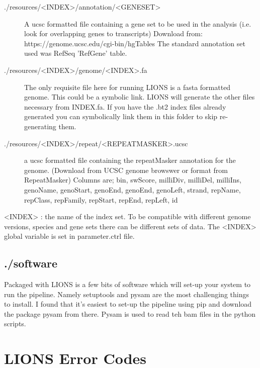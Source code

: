 \documentclass[11pt]{scrartcl}
\newcommand{\arrows}[1]{\textless #1\textgreater}
\begin{document}
\begin{description}
\item[./resources/\arrows{INDEX}/annotation/\arrows{GENESET}] A ucsc formatted file containing a gene set to be
  used in the analysis (i.e. look for overlapping genes to transcripts)
  Download from: https://genome.ucsc.edu/cgi-bin/hgTables
  The standard annotation set used was RefSeq 'RefGene' table.

\item[./resources/\arrows{INDEX}/genome/\arrows{INDEX}.fa] The only requisite file here for running LIONS is a fasta
  formatted genome. This could be a symbolic link. LIONS will generate
  the other files necessary from INDEX.fa. If you have the .bt2 index
  files already generated you can symbolically link them in this folder
  to skip re-generating them.

\item[./resources/\arrows{INDEX}/repeat/\arrows{REPEATMASKER}.ucsc] a ucsc formatted file containing the repeatMasker
  annotation for the genome.
  (Download from UCSC genome browswer or format from RepeatMasker)
  Columns are;
  bin, swScore, milliDiv, milliDel, milliIns, genoName, genoStart,
  genoEnd, genoEnd, genoLeft, strand, repName, repClass, repFamily,
  repStart, repEnd, repLeft, id
\end{description}
\begin{framed}
\arrows{INDEX} : the name of the index set. To be compatible with different
  genome versions, species and gene sets there can be different sets
  of data. The \arrows{INDEX} global variable is set in parameter.ctrl file.
\end{framed}

  \subsection{./software}
  Packaged with LIONS is a few bits of software which will set-up your
  system to run the pipeline. Namely setuptools and pysam are the most
  challenging things to install. I found that it's easiest to set-up
  the pipeline using pip and download the package pysam from there.
  Pysam is used to read teh bam files in the python scripts.




\clearpage
\section{LIONS Error Codes}
\end{document}
